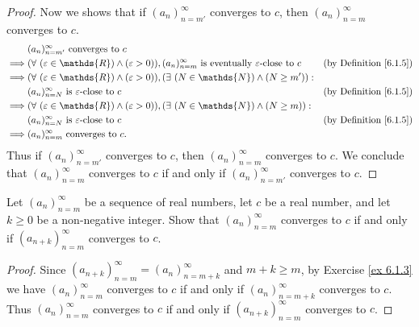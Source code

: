 \begin{proof}
Now we shows that if \((a_n)_{n = m'}^\infty\) converges to \(c\), then \((a_n)_{n = m}^\infty\) converges to \(c\).
\begin{align*}
& (a_n)_{n = m'}^\infty \text{ converges to } c \\
\implies & (\forall\ (\varepsilon \in \mathds{R}) \land (\varepsilon > 0)), (a_n)_{n = m}^\infty \text{ is eventually } \varepsilon\text{-close to } c & \text{(by Definition \ref{6.1.5})} \\
\implies & (\forall\ (\varepsilon \in \mathds{R}) \land (\varepsilon > 0)), (\exists\ (N \in \mathds{N}) \land (N \geq m')) : \\
& (a_n)_{n = N}^\infty \text{ is } \varepsilon\text{-close to } c & \text{(by Definition \ref{6.1.5})} \\
\implies & (\forall\ (\varepsilon \in \mathds{R}) \land (\varepsilon > 0)), (\exists\ (N \in \mathds{N}) \land (N \geq m)) : \\
& (a_n)_{n = N}^\infty \text{ is } \varepsilon\text{-close to } c & \text{(by Definition \ref{6.1.5})} \\
\implies & (a_n)_{n = m}^\infty \text{ converges to } c.
\end{align*}
Thus if \((a_n)_{n = m'}^\infty\) converges to \(c\), then \((a_n)_{n = m}^\infty\) converges to \(c\).
We conclude that \((a_n)_{n = m}^\infty\) converges to \(c\) if and only if \((a_n)_{n = m'}^\infty\) converges to \(c\).
\end{proof}

\begin{exercise}\label{ex 6.1.4}
Let \((a_n)_{n = m}^\infty\) be a sequence of real numbers, let \(c\) be a real number, and let \(k \geq 0\) be a non-negative integer.
Show that \((a_n)_{n = m}^\infty\) converges to \(c\) if and only if \((a_{n + k})_{n = m}^\infty\) converges to \(c\).
\end{exercise}

\begin{proof}
Since \((a_{n + k})_{n = m}^\infty = (a_n)_{n = m + k}^\infty\) and \(m + k \geq m\), by Exercise \ref{ex 6.1.3} we have \((a_n)_{n = m}^\infty\) converges to \(c\) if and only if \((a_n)_{n = m + k}^\infty\) converges to \(c\).
Thus \((a_n)_{n = m}^\infty\) converges to \(c\) if and only if \((a_{n + k})_{n = m}^\infty\) converges to \(c\).
\end{proof}